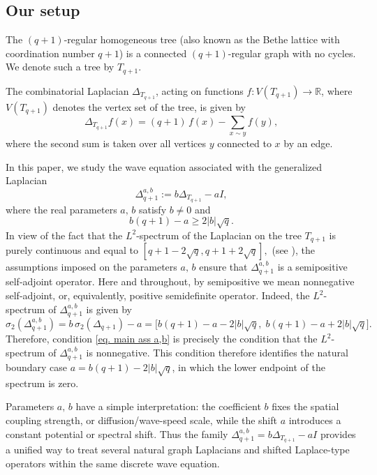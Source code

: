 \documentclass[12pt]{amsart}
\numberwithin{equation}{section}
\theoremstyle{boldremark}
\begin{document}
\subsection{Our setup} The $(q+1)$-regular homogeneous tree (also known as the Bethe lattice with coordination number $q+1$) is a connected $(q+1)$-regular graph with no cycles. We denote such a tree by $T_{q+1}$.

The combinatorial Laplacian $\Delta_{T_{q+1}}$, acting on functions $f:V(T_{q+1})\to\mathbb{R}$, where $V(T_{q+1})$ denotes the vertex set of the tree, is given by
\begin{equation*}%
    \Delta_{T_{q+1}} f(x) = (q+1)\, f(x) - \sum_{x \sim y} f(y),
\end{equation*}
where the second sum is taken over all vertices $y$ connected to $x$ by an edge. 

In this paper, we study the wave equation associated with the generalized Laplacian
$$\Delta_{q+1}^{a,b}:= b\Delta_{T_{q+1}} - aI,$$
where the real parameters $a,\,b$ satisfy $b\neq0$ and 
\begin{equation}\label{eq. main ass a,b}
b(q+1)-a\geq 2|b|\sqrt{q}.
\end{equation}
In view of the fact that the $L^2$-spectrum of the Laplacian on the tree $T_{q+1}$ is purely continuous and equal to $
[q+1-2\sqrt{q},q+1+2\sqrt{q}],
$
(see \cite{MW89}), the assumptions imposed on the parameters $a,\,b$ ensure that $\Delta_{q+1}^{a,b}$ is a semipositive self-adjoint operator. Here and throughout, by semipositive we mean nonnegative self-adjoint, or, equivalently, positive semidefinite operator. Indeed, the $L^2$-spectrum of $\Delta_{q+1}^{a,b}$ is given by
\[
\sigma_2\!\left(\Delta^{a,b}_{q+1}\right)
=
b\,\sigma_2\!\left(\Delta_{q+1}\right)-a
=
\bigl[
b(q+1)-a-2|b|\sqrt q,\;
b(q+1)-a+2|b|\sqrt q
\bigr].
\]
Therefore, condition \eqref{eq. main ass a,b} 
is precisely the condition that the $L^2$-spectrum of $\Delta_{q+1}^{a,b}$ is nonnegative. This condition therefore identifies the natural boundary case $a=b(q+1) -2|b|\sqrt{q}$, in which the lower endpoint of the spectrum is zero.

Parameters $a,\, b$ have a simple interpretation: the coefficient $b$ fixes the spatial coupling strength, or diffusion/wave-speed scale, while the shift $a$ introduces a constant potential or spectral shift. Thus the family $\Delta_{q+1}^{a,b}=b\Delta_{T_{q+1}}-aI$ provides a unified way to treat several natural graph Laplacians and shifted Laplace-type operators within the same discrete wave equation.
\end{document}
